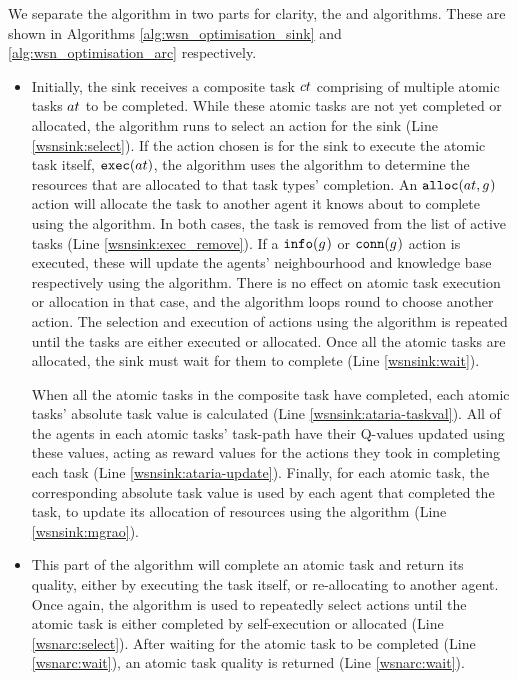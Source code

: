 We separate  the \acronymWSNOptimisation{}{} algorithm in two parts for clarity, the \acronymWSNOptimisationSink{}{} and \acronymWSNOptimisationArc{}{} algorithms. These are shown in Algorithms \ref{alg:wsn_optimisation_sink} and \ref{alg:wsn_optimisation_arc} respectively. 

\begin{itemize}
	\item[]  \textbf{\acronymWSNOptimisationSink{}{}} Initially, the sink receives a composite task $\varCompositeTask{}{}$ comprising of multiple atomic tasks $\varAtomicTask{}{}$ to be completed. While these atomic tasks are not yet completed or allocated, the  \acronymATARIA{}{} algorithm runs to select an action for the sink (Line \ref{wsnsink:select}).  If the action chosen is for the sink to execute the atomic task itself, $\functionExec{}{}$, the algorithm uses the \acronymMGRAO{}{} algorithm to determine the resources that are allocated to that task types' completion. An $\functionAlloc{}{}$ action will allocate the task to another agent it knows about to complete using the \acronymWSNOptimisationArc{}{} algorithm. In both cases, the task is removed from the list of active tasks  (Line \ref{wsnsink:exec_remove}). If a $\functionInfo{}{}$ or $\functionLink{}{}$ action is executed, these will update the agents' neighbourhood and knowledge base respectively using the \acronymATARIA{}{} algorithm. There is no effect on atomic task execution or allocation in that case, and the algorithm loops round to choose another action. The selection and execution of actions using the \acronymATARIA{}{} algorithm is repeated until the tasks are either executed or allocated. Once all the atomic tasks are allocated, the sink must wait for them to complete (Line \ref{wsnsink:wait}). 
	
	When all the atomic tasks in the composite task have completed, each atomic tasks' absolute task value is calculated (Line \ref{wsnsink:ataria-taskval}). All of the agents in each atomic tasks' task-path have their Q-values updated using these values, acting as reward values for the actions they took in completing each task (Line \ref{wsnsink:ataria-update}). Finally, for each atomic task, the corresponding absolute task value is used by each agent that completed the task, to update its allocation of resources using the \acronymMGRAO{}{} algorithm (Line \ref{wsnsink:mgrao}).

	\item[] \textbf{\acronymWSNOptimisationArc{}{}} This part of the algorithm will complete an atomic task and return its quality, either by executing the task itself, or re-allocating to another agent.  Once again,  the \acronymATARIA{}{} algorithm is used to repeatedly select actions until the atomic task is either completed by  self-execution or allocated (Line \ref{wsnarc:select}). After waiting for the atomic task to be completed (Line \ref{wsnarc:wait}),  an atomic task quality is returned (Line \ref{wsnarc:wait}).
\end{itemize}
